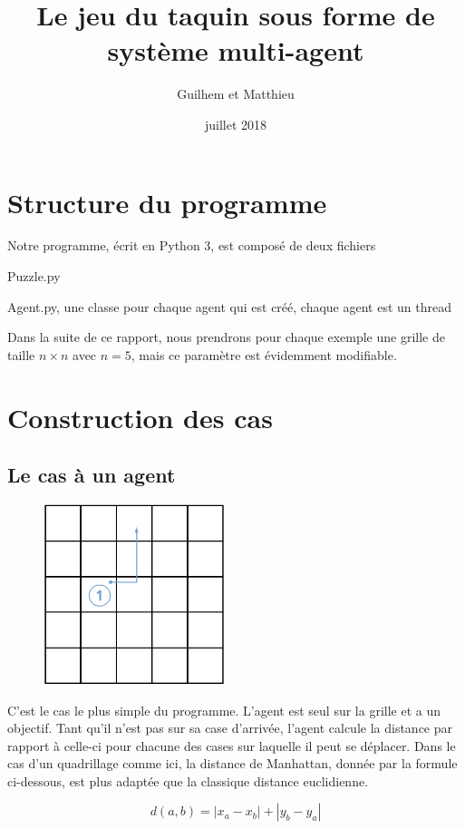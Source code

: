 \documentclass[a4paper, 12pt, french]{article}
\title{Le jeu du taquin sous forme de système multi-agent}
\author{Guilhem \bsc{Marion} et Matthieu \bsc{Vieira}}
\date{juillet 2018}
\begin{document}
\maketitle

\section{Structure du programme}

Notre programme, écrit en Python 3, est composé de deux fichiers

Puzzle.py 

Agent.py, une classe pour chaque agent qui est créé, chaque agent est un thread

Dans la suite de ce rapport, nous prendrons pour chaque exemple une grille de taille $n \times n$ avec $n = 5$, mais ce paramètre est évidemment modifiable.

\section{Construction des cas}

\subsection{Le cas à un agent}

\begin{figure}[h]
	\centering
	\includegraphics[width=200px]{images/base_case.png}
\end{figure}

C’est le cas le plus simple du programme. L'agent est seul sur la grille et a un objectif. Tant qu'il n'est pas sur sa case d'arrivée, l'agent calcule la distance par rapport à celle-ci pour chacune des cases sur laquelle il peut se déplacer. Dans le cas d'un quadrillage comme ici, la distance de Manhattan, donnée par la formule ci-dessous, est plus adaptée que la classique distance euclidienne.

\[
d(a, b) = |x_a - x_b| + |y_b - y_a|
\]
\end{document}
